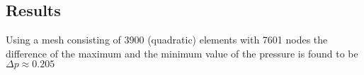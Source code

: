    

\subsection*{Results}

Using a mesh consisting of 3900 (quadratic) elements with 7601 nodes
the difference of the maximum and the minimum value of the pressure 
is found to be $\Delta p \approx 0.205$


   





















